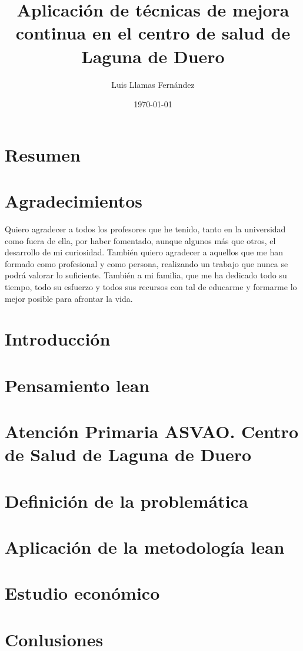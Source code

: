 \documentclass[12pt, a4paper]{report}
\begin{document}
\title{Aplicación de técnicas de mejora continua en el centro de salud de Laguna de Duero}
\author{Luis Llamas Fernández}
\date{\today}
\maketitle

\chapter*{Resumen}
\chapter*{Agradecimientos}

Quiero agradecer a todos los profesores que he tenido, tanto en la universidad como fuera de ella, por haber fomentado, aunque algunos más que otros, el desarrollo de mi curiosidad. También quiero agradecer a aquellos que me han formado como profesional y como persona, realizando un trabajo que nunca se podrá valorar lo suficiente. También a mi familia, que me ha dedicado todo su tiempo, todo su esfuerzo y todos sus recursos con tal de educarme y formarme lo mejor posible para afrontar la vida.

\tableofcontents

\chapter{Introducción}


\chapter{Pensamiento lean}


\chapter{Atención Primaria ASVAO. Centro de Salud de Laguna de Duero}


\chapter{Definición de la problemática}

\chapter{Aplicación de la metodología lean}

\chapter{Estudio económico}

\chapter{Conlusiones}


\end{document}
